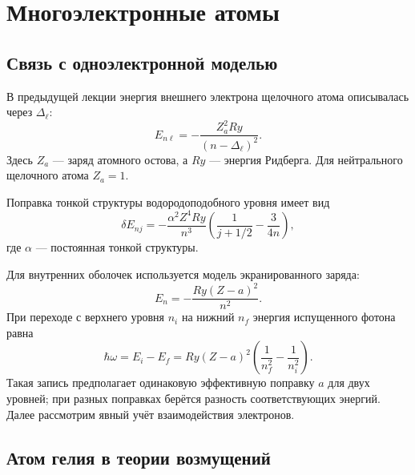 \documentclass[../final.tex]{subfiles}
\begin{document}
\ifSubfilesClassLoaded{\setcounter{chapter}{2}\setcounter{section}{0}}{}

\chapter{Многоэлектронные атомы}

\section{Связь с одноэлектронной моделью}

В предыдущей лекции энергия внешнего электрона щелочного атома
описывалась через  \(\Delta_\ell\):
\begin{equation*}
    E_{n\ell}=-\frac{Z_a^2Ry}{(n-\Delta_\ell)^2}.
\end{equation*}
Здесь \(Z_a\) --- заряд атомного остова, а \(Ry\) --- энергия Ридберга.
Для нейтрального щелочного атома \(Z_a=1\).

Поправка тонкой структуры водородоподобного уровня имеет вид
\begin{equation*}
    \delta E_{nj}
    =-\frac{\alpha^2 Z^4Ry}{n^3}
    \left(\frac{1}{j+1/2}-\frac{3}{4n}\right),
\end{equation*}
где \(\alpha\) --- постоянная тонкой структуры.

Для внутренних оболочек используется модель экранированного заряда:
\begin{equation*}
    E_n=-\frac{Ry(Z-a)^2}{n^2}.
\end{equation*}
При переходе с верхнего уровня \(n_i\) на нижний \(n_f\)
энергия испущенного фотона равна
\begin{equation*}
    \hbar\omega=E_i-E_f
    =Ry(Z-a)^2\left(\frac{1}{n_f^2}-\frac{1}{n_i^2}\right).
\end{equation*}
Такая запись предполагает одинаковую эффективную поправку \(a\)
для двух уровней; при разных поправках берётся разность соответствующих
энергий. Далее рассмотрим явный учёт взаимодействия электронов.

\section{Атом гелия в теории возмущений}
\end{document}
